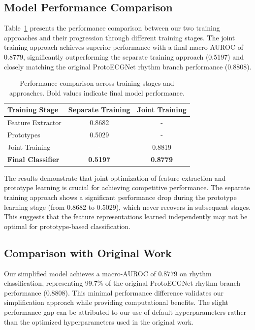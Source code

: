 \subsection{Model Performance Comparison}

Table~\ref{tab:results} presents the performance comparison between our two training approaches and their progression through different training stages. The joint training approach achieves superior performance with a final macro-AUROC of 0.8779, significantly outperforming the separate training approach (0.5197) and closely matching the original ProtoECGNet rhythm branch performance (0.8808).

\begin{table}[h]
\centering
\caption{Performance comparison across training stages and approaches. Bold values indicate final model performance.}
\label{tab:results}
\begin{tabular}{lcc}
\hline
\textbf{Training Stage} & \textbf{Separate Training} & \textbf{Joint Training} \\
\hline
Feature Extractor & 0.8682 & - \\
Prototypes & 0.5029 & - \\
Joint Training & - & 0.8819 \\
\textbf{Final Classifier} & \textbf{0.5197} & \textbf{0.8779} \\
\hline
\end{tabular}
\end{table}

The results demonstrate that joint optimization of feature extraction and prototype learning is crucial for achieving competitive performance. The separate training approach shows a significant performance drop during the prototype learning stage (from 0.8682 to 0.5029), which never recovers in subsequent stages. This suggests that the feature representations learned independently may not be optimal for prototype-based classification.

\subsection{Comparison with Original Work}

Our simplified model achieves a macro-AUROC of 0.8779 on rhythm classification, representing 99.7\% of the original ProtoECGNet rhythm branch performance (0.8808). This minimal performance difference validates our simplification approach while providing computational benefits. The slight performance gap can be attributed to our use of default hyperparameters rather than the optimized hyperparameters used in the original work.


